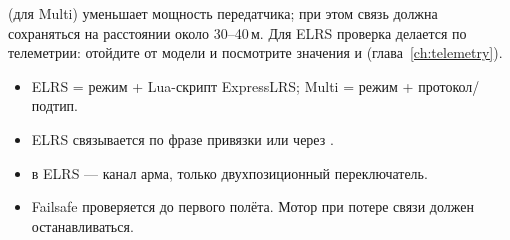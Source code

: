  (для Multi) уменьшает мощность передатчика; при этом связь должна сохраняться
на расстоянии около 30--40\,м. Для ELRS проверка делается по телеметрии: отойдите от модели и
посмотрите значения  и  (глава~\ref{ch:telemetry}).

\begin{summary}
\begin{itemize}
  \item ELRS = режим  + Lua-скрипт ExpressLRS; Multi = режим  +
        протокол/подтип.
  \item ELRS связывается по фразе привязки или через \menu{[Bind]}.
  \item {} в ELRS --- канал арма, только двухпозиционный переключатель.
  \item Failsafe проверяется до первого полёта. Мотор при потере связи должен останавливаться.
\end{itemize}
\end{summary}
